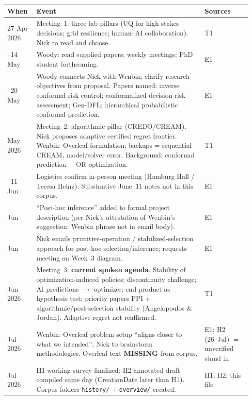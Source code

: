 \documentclass[11pt]{article}
\begin{document}
\begin{center}
\begin{tabularx}{\linewidth}{@{}l >{\RaggedRight\arraybackslash}X
  >{\RaggedRight\arraybackslash}X@{}}
\toprule
\textbf{When} & \textbf{Event} & \textbf{Sources} \\
\midrule
27 Apr 2026 & Meeting~1: three lab pillars (UQ for high-stakes decisions;
  grid resilience; human--AI collaboration). Nick to read and choose. & T1 \\
\addlinespace
11--14 May & Woody: read supplied papers; weekly meetings; PhD student forthcoming. & E1 \\
\addlinespace
18--20 May & Woody connects Nick with Wenbin; clarify research objectives from proposal.
  Papers named: inverse conformal risk control; conformalized decision risk assessment;
  Gen-DFL; hierarchical probabilistic conformal prediction. & E1 \\
\addlinespace
22 May 2026 & Meeting~2: algorithmic pillar (CREDO/CREAM). Nick proposes adaptive
  certified regret frontier. Wenbin: Overleaf formulation; backups = sequential CREAM,
  model/solver error. Background: conformal prediction + OR optimization. & T1 \\
\addlinespace
8--11 Jun & Logistics confirm in-person meeting (Hamburg Hall / Teresa Heinz).
  Substantive June~11 notes not in this corpus. & E1 \\
\addlinespace
12 Jun & ``Post-hoc inference'' added to formal project description
  (per Nick's attestation of Wenbin's suggestion; Wenbin phrase not in email body). & E1 \\
\addlinespace
25 Jun & Nick emails primitive-operation / stabilized-selection approach for post-hoc
  selection/inference; requests meeting on Week~3 diagram. & E1 \\
\addlinespace
29 Jun 2026 & Meeting~3: \textcolor{current}{\textbf{current spoken agenda}}. Stability of
  optimization-induced policies; discontinuity challenge; AI predictions $\to$ optimizer;
  end product as hypothesis test; priority papers PPI + algorithmic/post-selection
  stability (Angelopoulos \& Jordan). Adaptive regret not reaffirmed. & T1 \\
\addlinespace
2 Jul 2026 & Wenbin: Overleaf problem setup ``aligns closer to what we intended''; Nick to
  brainstorm methodologies. Overleaf text \textbf{MISSING} from corpus. &
  E1; H2 (26~Jul) $=$ unverified stand-in \\
\addlinespace
26 Jul 2026 & H1 working survey finalized; H2 annotated draft compiled same day
  (CreationDate later than H1). Corpus folders \texttt{history/} + \texttt{overview/} created. &
  H1; H2; this file \\
\bottomrule
\end{tabularx}
\end{center}
\end{document}
